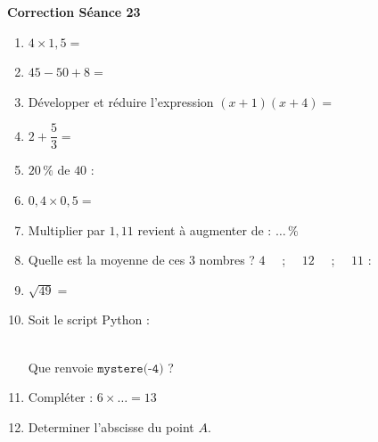 \documentclass[a4paper,11pt]{article}
\begin{document}
\vspace{0.5cm}
\begin{center}

\textbf{\textcolor{Couleur8}{Correction Séance 23}}\\
\vspace{2mm}

\end{center}


\begin{seanceD}{} %

\begin{enumerate}
	\item $4 \times 1{,}5=$\dotfill
	\item  $45-50+8=$\dotfill
	\item Développer et réduire l'expression $(x+1)(x+4)=$\dotfill
	\item $2+\dfrac{5}{3}=$\dotfill 
	\item $20\,\%$ de $40$ : \dotfill
	\item $0{,}4\times0{,}5=$\dotfill
	\item Multiplier par $1{,}11$ revient à augmenter de : $\ldots\,\%$
	\item Quelle est la moyenne de ces $3$ nombres ? $4$ \,\,\,\, ; \,\,\,\, $12$ \,\,\,\, ; \,\,\,\, $11$ : \dotfill
	\item $\sqrt{49}=$ \dotfill
	\item Soit le script Python : 

\medskip
\medskip\hspace*{10mm}\newline\medskip\\Que renvoie  $\texttt{mystere(-4)}$ ? \dotfill
	\item Compléter : $6\times \ldots =13$
	\item Determiner l'abscisse du point $A$. \dotfill\\\begin{center}
	\begin{tikzpicture}[baseline,scale = 0.6]


\end{tikzpicture}
\end{center}
\end{enumerate}
\end{seanceD}
\end{document}
